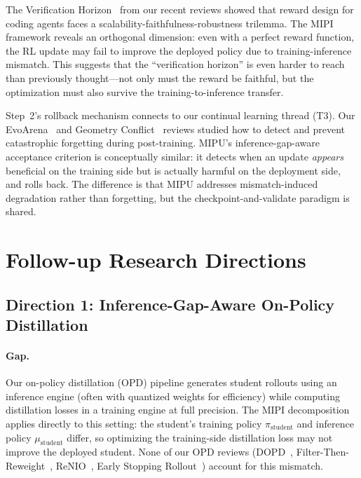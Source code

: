 \documentclass[11pt,a4paper]{article}
\begin{document}
The Verification Horizon~\cite{verificationhorizon2026} from our recent reviews showed that reward design for coding agents faces a scalability-faithfulness-robustness trilemma. The MIPI framework reveals an orthogonal dimension: even with a perfect reward function, the RL update may fail to improve the deployed policy due to training-inference mismatch. This suggests that the ``verification horizon'' is even harder to reach than previously thought---not only must the reward be faithful, but the optimization must also survive the training-to-inference transfer.

Step~2's rollback mechanism connects to our continual learning thread (T3). Our EvoArena~\cite{evoarena2026} and Geometry Conflict~\cite{geomconflict2026} reviews studied how to detect and prevent catastrophic forgetting during post-training. MIPU's inference-gap-aware acceptance criterion is conceptually similar: it detects when an update \emph{appears} beneficial on the training side but is actually harmful on the deployment side, and rolls back. The difference is that MIPU addresses mismatch-induced degradation rather than forgetting, but the checkpoint-and-validate paradigm is shared.

\section{Follow-up Research Directions}

\subsection{Direction 1: Inference-Gap-Aware On-Policy Distillation}

\paragraph{Gap.} Our on-policy distillation (OPD) pipeline generates student rollouts using an inference engine (often with quantized weights for efficiency) while computing distillation losses in a training engine at full precision. The MIPI decomposition applies directly to this setting: the student's training policy $\pi_{\mathrm{student}}$ and inference policy $\mu_{\mathrm{student}}$ differ, so optimizing the training-side distillation loss may not improve the deployed student. None of our OPD reviews (DOPD~\cite{dopd2026}, Filter-Then-Reweight~\cite{ftr2026}, ReNIO~\cite{renio2026}, Early Stopping Rollout~\cite{esr2026}) account for this mismatch.
\end{document}

